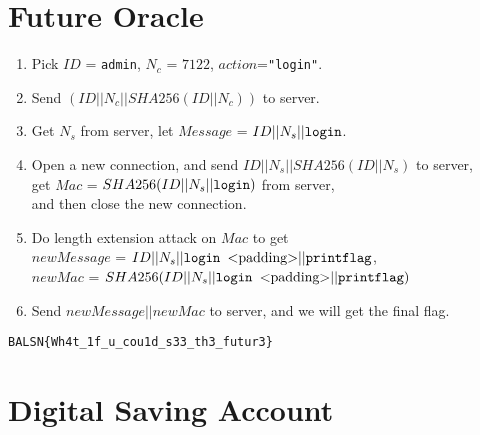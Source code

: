 \documentclass[12pt,a4paper]{article}
\begin{document}
\section{Future Oracle}
\begin{enumerate}[label=\arabic*., topsep=0pt,itemsep=0pt,partopsep=1ex,parsep=1ex]
    \item Pick $ID$ = \texttt{admin}, $N_c$ = $7122$, $action$=\texttt{"login"}.
    \item Send $(ID||N_c||SHA256(ID||N_c))$ to server.
    \item Get $N_s$ from server, let $Message$ = $ID||N_s||\text{\texttt{login}}$.
    \item Open a new connection, and send $ID||N_s||SHA256(ID||N_s)$ to server,\\
       get $Mac$ = $SHA256(ID||N_s||\text{\texttt{login}})$ from server,\\
       and then close the new connection.
    \item Do length extension attack on $Mac$ to get\\
        $newMessage$ = $ID||N_s||\text{\texttt{login }<padding>}||\text{\texttt{printflag}}$,\\
        $newMac$ = $SHA256(ID||N_s||\text{\texttt{login }<padding>}||\text{\texttt{printflag}})$
    \item Send $newMessage||newMac$ to server, and we will get the final flag.
\end{enumerate}
\texttt{BALSN\{Wh4t\_1f\_u\_cou1d\_s33\_th3\_futur3\}}

\section{Digital Saving Account}
        
\end{document}
